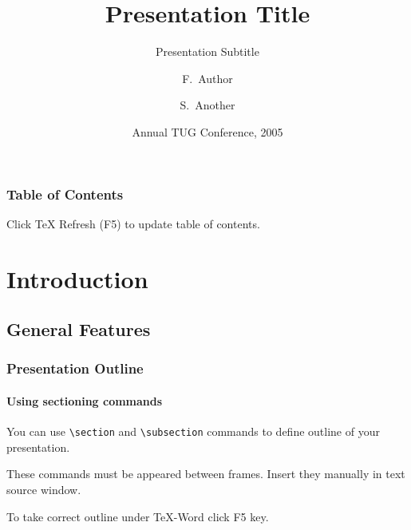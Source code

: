 \documentclass{beamer}
\begin{document}

\title{Presentation Title}
\subtitle{Presentation Subtitle}

\author{F.~Author \and S.~Another}

\date[TUG 2005]{Annual TUG Conference, 2005}

\subject{Desktop Publishing} %

\begin{frame}
  \titlepage
\end{frame}

\begin{frame}
  \frametitle{Table of Contents}
  \tableofcontents
  Click TeX Refresh (F5) to update table of contents.
\end{frame}

\section{Introduction}

\subsection{General Features}

\begin{frame}
  \frametitle{Presentation Outline}
  \framesubtitle{Using sectioning commands}

  You can use \texttt{\textbackslash section}
  and \texttt{\textbackslash subsection} commands
  to define outline of your presentation.

  These commands must be appeared between frames.
  Insert they manually in text source window. 

  To take correct outline under \TeX-Word click F5 key.

\end{frame}
\end{document}
